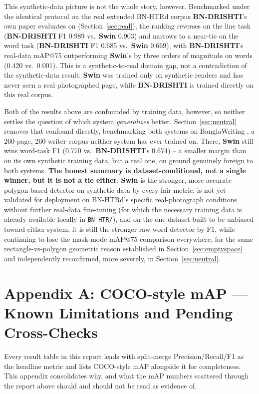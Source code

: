 \documentclass[11pt]{article}
\newcommand{\swin}{\textbf{Swin}}
\newcommand{\bnd}{\textbf{BN-DRISHTI}}
\begin{document}
This synthetic-data picture is not the whole story, however. Benchmarked under the
identical protocol on the real extended BN-HTRd corpus \bnd's own paper
\cite{jubaer2023bndrishti} evaluates on (Section~\ref{sec:real}), the ranking reverses
on the line task (\bnd{} F1 0.989 vs.\ \swin{} 0.903) and narrows to a near-tie on the
word task (\bnd{} F1 0.685 vs.\ \swin{} 0.669), with \bnd's real-data mAP@75
outperforming \swin's by three orders of magnitude on words (0.420 vs.\ 0.001). This is
a synthetic-to-real domain gap, not a contradiction of the synthetic-data result:
\swin{} was trained only on synthetic renders and has never seen a real photographed
page, while \bnd{} is trained directly on this real corpus.

Both of the results above are confounded by training data, however, so neither settles
the question of which system \emph{generalizes} better. Section~\ref{sec:neutral}
removes that confound directly, benchmarking both systems on BanglaWriting
\cite{mridha2021banglawriting}, a 260-page, 260-writer corpus neither system has ever
trained on. There, \swin{} still wins word-task F1 (0.770 vs.\ \bnd's 0.674) -- a
smaller margin than on its own synthetic training data, but a real one, on ground
genuinely foreign to both systems. \textbf{The honest summary is dataset-conditional,
not a single winner, but it is not a tie either}: \swin{} is the stronger, more
accurate polygon-based detector on synthetic data by every fair metric, is not yet
validated for deployment on BN-HTRd's specific real-photograph conditions without
further real-data fine-tuning (for which the necessary training data is already
available locally in \texttt{BN\_HTR/}), and on the one dataset built to be unbiased
toward either system, it is still the stronger raw word detector by F1, while
continuing to lose the mask-mode mAP@75 comparison everywhere, for the same
rectangle-vs-polygon geometric reason established in Section~\ref{sec:emptyspace} and
independently reconfirmed, more severely, in Section~\ref{sec:neutral}.

\appendix
\section*{Appendix A: COCO-style mAP --- Known Limitations and Pending Cross-Checks}
\label{sec:appendixA}

Every result table in this report leads with split-merge Precision/Recall/F1
\cite{wolf2006detEval} as the headline metric and lists COCO-style mAP
\cite{lin2014coco} alongside it for completeness. This appendix consolidates why, and
what the mAP numbers scattered through the report above should and should not be read
as evidence of.
\end{document}
